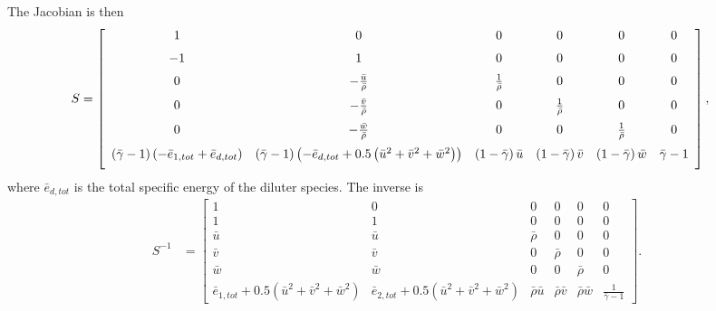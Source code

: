 The Jacobian is then
\begin{align}
S &= 
\left[\begin{array}{cccccc}
    1      %
  & 0      %
  & 0      %
  & 0      %
  & 0      %
  & 0      %
  \\ \noalign{\medskip}
   -1      %
  & 1      %
  & 0      %
  & 0      %
  & 0      %
  & 0      %
  \\ \noalign{\medskip}
    0                                %
  & - \frac{\bar{u}}{\bar{\rho}}     %
  & \frac{1}{\bar{\rho}}             %
  & 0                                %
  & 0                                %
  & 0                                %
  \\ \noalign{\medskip}
    0                                %
  & - \frac{\bar{v}}{\bar{\rho}}     %
  & 0                                %
  & \frac{1}{\bar{\rho}}             %
  & 0                                %
  & 0                                %
  \\ \noalign{\medskip}
    0                                %
  & - \frac{\bar{w}}{\bar{\rho}}     %
  & 0                                %
  & 0                                %
  & \frac{1}{\bar{\rho}}             %
  & 0                                %
  \\ \noalign{\medskip}
    \left(\bar{\gamma} - 1\right) \left(-\bar{e}_{1,tot}+\bar{e}_{d,tot}\right) %
  & \left(\bar{\gamma} - 1\right) 
    \left(-\bar{e}_{d,tot} + 
    0.5 \left(\bar{u}^2 + \bar{v}^2 + \bar{w}^2\right)
    \right) %
  & \left(1 - \bar{\gamma}\right) \bar{u}       %
  & \left(1 - \bar{\gamma}\right) \bar{v}       %
  & \left(1 - \bar{\gamma}\right) \bar{w}       %
  & \bar{\gamma}-1                              %
  \\ \noalign{\medskip}
\end{array}\right]
,
\end{align}
%
where $\bar{e}_{d,tot}$ is the total specific energy of the diluter species.
The inverse is
\begin{align}
S^{-1} &= \left[\begin{array}{cccccc}
  1         & 0         & 0          & 0            & 0            & 0 \\
  1         & 1         & 0          & 0            & 0            & 0 \\
  \bar{u}   & \bar{u}   & \bar{\rho} & 0            & 0            & 0 \\
  \bar{v}   & \bar{v}   & 0          & \bar{\rho}   & 0            & 0 \\
  \bar{w}   & \bar{w}   & 0          & 0            & \bar{\rho}   & 0 \\
  \bar{e}_{1,tot} + 0.5 \left( \bar{u}^2 + \bar{v}^2 + \bar{w}^2\right)
& \bar{e}_{2,tot} + 0.5 \left( \bar{u}^2 + \bar{v}^2 + \bar{w}^2\right)
& \bar{\rho} \bar{u} 
& \bar{\rho} \bar{v} 
& \bar{\rho} \bar{w} 
& \frac{1}{\bar{\gamma}-1}
\end{array}\right]
.
\end{align}

